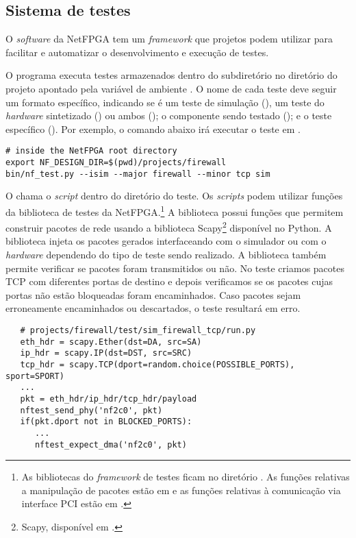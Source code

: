 \subsection{Sistema de testes}
\label{sec:impl.test}

O \emph{software} da NetFPGA tem um \emph{framework} que projetos
podem utilizar para facilitar e automatizar o desenvolvimento e
execução de testes.

O programa  executa testes armazenados dentro do
subdiretório  no diretório do projeto apontado pela
variável de ambiente . O nome de cada teste
deve seguir um formato específico, indicando se é um teste de
simulação (), um teste do \emph{hardware} sintetizado
() ou ambos (); o componente sendo testado
(); e o teste específico ().  Por exemplo, o
comando abaixo irá executar o teste em
.

\begin{verbatim}
# inside the NetFPGA root directory
export NF_DESIGN_DIR=$(pwd)/projects/firewall
bin/nf_test.py --isim --major firewall --minor tcp sim
\end{verbatim}

O  chama o \emph{script}  dentro do
diretório do teste.  Os \emph{scripts}  podem utilizar
funções da biblioteca de testes da NetFPGA.\footnote{As bibliotecas
do \emph{framework} de testes ficam no diretório
.  As funções relativas a manipulação de
pacotes estão em  e as funções relativas à
comunicação via interface PCI estão em .} A
biblioteca possui funções que permitem construir pacotes de rede
usando a biblioteca Scapy\footnote{Scapy, disponível em
.} disponível no Python.  A
biblioteca injeta os pacotes gerados interfaceando com o simulador
ou com o \emph{hardware} dependendo do tipo de teste sendo
realizado.  A biblioteca também permite verificar se pacotes foram
transmitidos ou não.  No teste  criamos
pacotes TCP com diferentes portas de destino e depois verificamos se
os pacotes cujas portas não estão bloqueadas foram encaminhados.
Caso pacotes sejam erroneamente encaminhados ou descartados, o teste
resultará em erro.

\begin{verbatim}
   # projects/firewall/test/sim_firewall_tcp/run.py
   eth_hdr = scapy.Ether(dst=DA, src=SA)
   ip_hdr = scapy.IP(dst=DST, src=SRC)
   tcp_hdr = scapy.TCP(dport=random.choice(POSSIBLE_PORTS), sport=SPORT)
   ...
   pkt = eth_hdr/ip_hdr/tcp_hdr/payload
   nftest_send_phy('nf2c0', pkt)
   if(pkt.dport not in BLOCKED_PORTS):
      ...
      nftest_expect_dma('nf2c0', pkt)
\end{verbatim}

